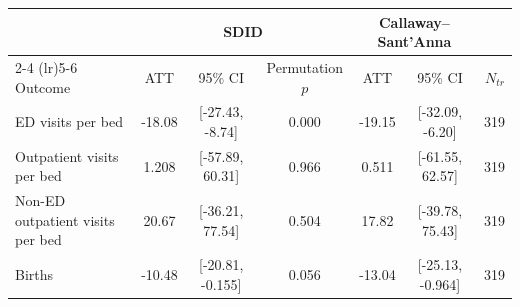 \begin{tabular}{lcccccr}
\toprule
 & \multicolumn{3}{c}{SDID} & \multicolumn{2}{c}{Callaway--Sant'Anna} & \\
\cmidrule(lr){2-4} \cmidrule(lr){5-6}
Outcome & ATT & 95\% CI & Permutation $p$ & ATT & 95\% CI & $N_{tr}$ \\
\midrule
ED visits per bed & -18.08 & [-27.43, -8.74] & 0.000 & -19.15 & [-32.09, -6.20] & 319 \\
Outpatient visits per bed & 1.208 & [-57.89, 60.31] & 0.966 & 0.511 & [-61.55, 62.57] & 319 \\
Non-ED outpatient visits per bed & 20.67 & [-36.21, 77.54] & 0.504 & 17.82 & [-39.78, 75.43] & 319 \\
Births & -10.48 & [-20.81, -0.155] & 0.056 & -13.04 & [-25.13, -0.964] & 319 \\
\bottomrule
\end{tabular}
